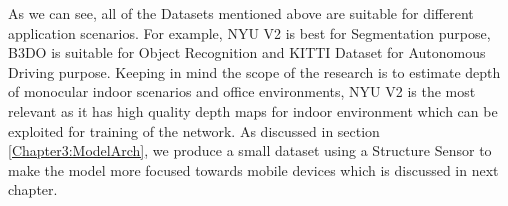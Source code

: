 As we can see, all of the Datasets mentioned above are suitable for different application scenarios. For example, NYU V2 \cite{Silberman:ECCV12} is best for Segmentation purpose, B3DO \cite{Janoch:EECS-2012-85} is suitable for Object Recognition and KITTI Dataset \cite{Geiger2013IJRR} for Autonomous Driving purpose. Keeping in mind the scope of the research is to estimate depth of monocular indoor scenarios and office environments, NYU V2 is the most relevant as it has high quality depth maps for indoor environment which can be exploited for training of the network. As discussed in section \ref{Chapter3:ModelArch}, we produce a small dataset using a Structure Sensor to make the model more focused towards mobile devices which is discussed in next chapter.









